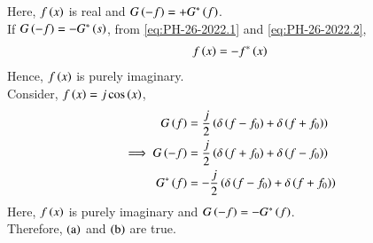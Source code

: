 \documentclass[journal,12pt,twocolumn]{IEEEtran}
\theoremstyle{remark}
\begin{document}
Here, $f\left(x\right)$ is real and $G\left(-f\right) = + G^*\left(f\right)$.\\
If $G\left(-f\right) = - G^*\left(s\right)$, from \eqref{eq:PH-26-2022.1} and \eqref{eq:PH-26-2022.2},
\begin{align}
    f\left(x\right) = -f^*\left(x\right)
\end{align}
Hence, $f\left(x\right)$ is purely imaginary. \\
Consider, $f\left(x\right) = j \cos\left(x\right) $,
\begin{align}
    G\left(f\right) &= \frac{j}{2} \left( \delta\left( f - f_0 \right) + \delta\left( f + f_0\right) \right) \\
    \implies G\left(-f\right) &= \frac{j}{2} \left( \delta\left( f + f_0 \right) + \delta\left( f - f_0\right) \right) \\
    G^*\left(f\right) &= -\frac{j}{2} \left( \delta\left( f - f_0 \right) + \delta\left( f + f_0\right) \right)
\end{align}
Here, $f\left(x\right)$ is purely imaginary and $G\left(-f\right) = -G^*\left(f\right)$. \\
Therefore, $\left(\text{a}\right)$ and $\left(\text{b}\right)$ are true.
\end{document}
